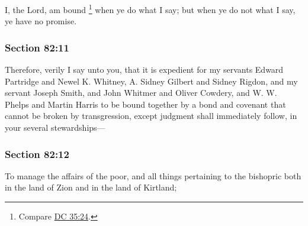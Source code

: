 		I, the Lord, am bound%
			\footnote{%
				Compare \hyperref[DC35-24]{DC 35:24}.
				}
		when ye do what I say; but when ye do not what I say, ye have no promise.


	\subsubsection{Section 82:11} %
		\label{DC82-11}

		Therefore, verily I say unto you, that it is expedient for my servants Edward Partridge and Newel K. Whitney, A. Sidney Gilbert and Sidney Rigdon, and my servant Joseph Smith, and John Whitmer and Oliver Cowdery, and W. W. Phelps and Martin Harris to be bound together by a bond and covenant that cannot be broken by transgression, except judgment shall immediately follow, in your several stewardships—


	\subsubsection{Section 82:12} %
		\label{DC82-12}

		To manage the affairs of the poor, and all things pertaining to the bishopric both in the land of Zion and in the land of Kirtland;


